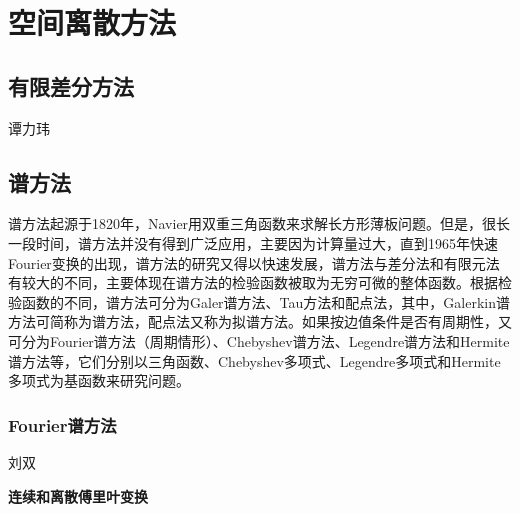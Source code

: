 \section{空间离散方法}

\subsection{有限差分方法}
{\color{red}\begin{center}
    谭力玮
\end{center}}

\subsection{谱方法}          

    谱方法起源于1820年，Navier用双重三角函数来求解长方形薄板问题。但是，很长一段时间，谱方法并没有得到广泛应用，主要因为计算量过大，直到1965年快速Fourier变换的出现，谱方法的研究又得以快速发展，谱方法与差分法和有限元法有较大的不同，主要体现在谱方法的检验函数被取为无穷可微的整体函数。根据检验函数的不同，谱方法可分为Galer谱方法、Tau方法和配点法，其中，Galerkin谱方法可简称为谱方法，配点法又称为拟谱方法。如果按边值条件是否有周期性，又可分为Fourier谱方法（周期情形）、Chebyshev谱方法、Legendre谱方法和Hermite谱方法等，它们分别以三角函数、Chebyshev多项式、Legendre多项式和Hermite多项式为基函数来研究问题。

\subsubsection{Fourier谱方法}                           
{\color{red}\begin{center}             
     刘双
\end{center}}                                                                                                      
                                                                                                                                                                                                                                                                                                                                                                                                                                                                                                                                                                                                                                                                                          \textbf{连续和离散傅里叶变换}
                                                                                                                                                                                                                                                                                                                                                                                                                                                                                                                                                                                                                                                                                          
